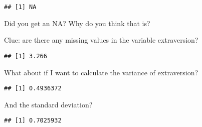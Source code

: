 \documentclass[
]{article}
\newenvironment{Shaded}{\begin{snugshade}}{\end{snugshade}}
\newcommand{\AttributeTok}[1]{\textcolor[rgb]{0.13,0.29,0.53}{#1}}
\newcommand{\CommentTok}[1]{\textcolor[rgb]{0.56,0.35,0.01}{\textit{#1}}}
\newcommand{\ConstantTok}[1]{\textcolor[rgb]{0.56,0.35,0.01}{#1}}
\newcommand{\FunctionTok}[1]{\textcolor[rgb]{0.13,0.29,0.53}{\textbf{#1}}}
\newcommand{\NormalTok}[1]{#1}
\newcommand{\SpecialCharTok}[1]{\textcolor[rgb]{0.81,0.36,0.00}{\textbf{#1}}}
\begin{document}
\begin{Shaded}
\end{Shaded}

\begin{verbatim}
## [1] NA
\end{verbatim}

Did you get an NA? Why do you think that is?

Clue: are there any missing values in the variable extraversion?

\begin{Shaded}
\end{Shaded}

\begin{verbatim}
## [1] 3.266
\end{verbatim}

What about if I want to calculate the variance of extraversion?

\begin{Shaded}
\end{Shaded}

\begin{verbatim}
## [1] 0.4936372
\end{verbatim}

And the standard deviation?

\begin{Shaded}
\end{Shaded}

\begin{verbatim}
## [1] 0.7025932
\end{verbatim}
\end{document}
